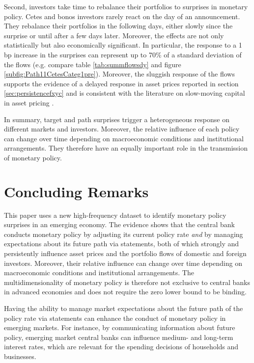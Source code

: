 \documentclass[a4paper, 12pt]{article}
\begin{document}
Second, investors take time to rebalance their portfolios to surprises in monetary policy. Cetes and bonos investors rarely react on the day of an announcement. They rebalance their portfolios in the following days, either slowly since the surprise or until after a few days later. Moreover, the effects are not only statistically but also economically significant. In particular, the response to a 1 bp increase in the surprises can represent up to 70\% of a standard deviation of the flows (e.g. compare table \ref{tab:summflowsdy} and figure \ref{subfig:Path11CetesCateg1pre}). Moreover, the sluggish response of the flows supports the evidence of a delayed response in asset prices reported in section \ref{sec:persistencefxyc} and is consistent with the literature on slow-moving capital in asset pricing \parencite{Duffie:2010}.

In summary, target and path surprises trigger a heterogeneous response on different markets and investors. Moreover, the relative influence of each policy can change over time depending on macroeconomic conditions and institutional arrangements. They therefore have an equally important role in the transmission of monetary policy.


\section{Concluding Remarks}\label{sec:conclusions}

This paper uses a new high-frequency dataset to identify monetary policy surprises in an emerging economy. The evidence shows that the central bank conducts monetary policy by adjusting its current policy rate \textit{and} by managing expectations about its future path via statements, both of which strongly and persistently influence asset prices and the portfolio flows of domestic and foreign investors. Moreover, their relative influence can change over time depending on macroeconomic conditions and institutional arrangements. 
The multidimensionality of monetary policy is therefore not exclusive to central banks in advanced economies and does not require the zero lower bound to be binding. 

Having the ability to manage market expectations about the future path of the policy rate via statements can enhance the conduct of monetary policy in emerging markets. For instance, by communicating information about future policy, emerging market central banks can influence medium- and long-term interest rates, which are relevant for the spending decisions of households and businesses.
\end{document}
